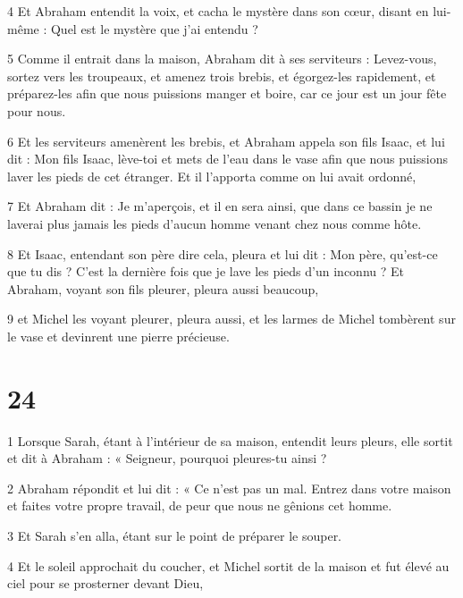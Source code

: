 \par 4 Et Abraham entendit la voix, et cacha le mystère dans son cœur, disant en lui-même : Quel est le mystère que j'ai entendu ?

\par 5 Comme il entrait dans la maison, Abraham dit à ses serviteurs : Levez-vous, sortez vers les troupeaux, et amenez trois brebis, et égorgez-les rapidement, et préparez-les afin que nous puissions manger et boire, car ce jour est un jour fête pour nous.

\par 6 Et les serviteurs amenèrent les brebis, et Abraham appela son fils Isaac, et lui dit : Mon fils Isaac, lève-toi et mets de l'eau dans le vase afin que nous puissions laver les pieds de cet étranger. Et il l'apporta comme on lui avait ordonné,

\par 7 Et Abraham dit : Je m'aperçois, et il en sera ainsi, que dans ce bassin je ne laverai plus jamais les pieds d'aucun homme venant chez nous comme hôte.

\par 8 Et Isaac, entendant son père dire cela, pleura et lui dit : Mon père, qu'est-ce que tu dis ? C'est la dernière fois que je lave les pieds d'un inconnu ? Et Abraham, voyant son fils pleurer, pleura aussi beaucoup,

\par 9 et Michel les voyant pleurer, pleura aussi, et les larmes de Michel tombèrent sur le vase et devinrent une pierre précieuse.

\chapter{24}

\par 1 Lorsque Sarah, étant à l'intérieur de sa maison, entendit leurs pleurs, elle sortit et dit à Abraham : « Seigneur, pourquoi pleures-tu ainsi ?

\par 2 Abraham répondit et lui dit : « Ce n'est pas un mal. Entrez dans votre maison et faites votre propre travail, de peur que nous ne gênions cet homme.

\par 3 Et Sarah s'en alla, étant sur le point de préparer le souper.

\par 4 Et le soleil approchait du coucher, et Michel sortit de la maison et fut élevé au ciel pour se prosterner devant Dieu,

